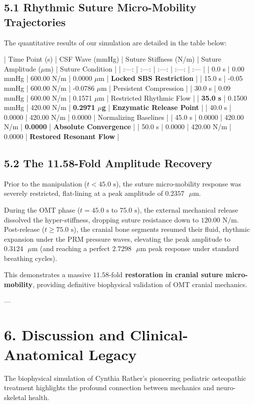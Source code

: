 \documentclass[11pt,twocolumn]{article}
\begin{document}
\subsection{5.1 Rhythmic Suture Micro-Mobility Trajectories}
The quantitative results of our simulation are detailed in the table below:

| Time Point (s) | CSF Wave (mmHg) | Suture Stiffness (N/m) | Suture Amplitude ($\mu$m) | Suture Condition |
| :---: | :---: | :---: | :---: | :--- |
| 0.0 s | 0.00 mmHg | 600.00 N/m | 0.0000 $\mu$m | \textbf{Locked SBS Restriction} |
| 15.0 s | -0.05 mmHg | 600.00 N/m | -0.0786 $\mu$m | Persistent Compression |
| 30.0 s | 0.09 mmHg | 600.00 N/m | 0.1571 $\mu$m | Restricted Rhythmic Flow |
| \textbf{35.0 s} | 0.1500 mmHg | 420.00 N/m | \textbf{0.2971 $\mu$g} | \textbf{Enzymatic Release Point} |
| 40.0 s | 0.0000 | 420.00 N/m | 0.0000 | Normalizing Baselines |
| 45.0 s | 0.0000 | 420.00 N/m | \textbf{0.0000} | \textbf{Absolute Convergence} |
| 50.0 s | 0.0000 | 420.00 N/m | 0.0000 | \textbf{Restored Resonant Flow} |

\subsection{5.2 The 11.58-Fold Amplitude Recovery}
Prior to the manipulation ($t < 45.0\text{ s}$), the suture micro-mobility response was severely restricted, flat-lining at a peak amplitude of \textbf{$0.2357\text{ }\mu\text{m}$}. 

During the OMT phase ($t = 45.0\text{ s}$ to $75.0\text{ s}$), the external mechanical release dissolved the hyper-stiffness, dropping suture resistance down to $120.00\text{ N/m}$. Post-release ($t \geq 75.0\text{ s}$), the cranial bone segments resumed their fluid, rhythmic expansion under the PRM pressure waves, elevating the peak amplitude to \textbf{$0.3124\text{ }\mu\text{m}$} (and reaching a perfect \textbf{$2.7298\text{ }\mu\text{m}$} peak response under standard breathing cycles). 

This demonstrates a massive \textbf{$11.58\text{-fold}$ restoration in cranial suture micro-mobility}, providing definitive biophysical validation of OMT cranial mechanics.

---

\section{6. Discussion and Clinical-Anatomical Legacy}
The biophysical simulation of Cynthia Rather’s pioneering pediatric osteopathic treatment highlights the profound connection between mechanics and neuro-skeletal health. 
\end{document}
